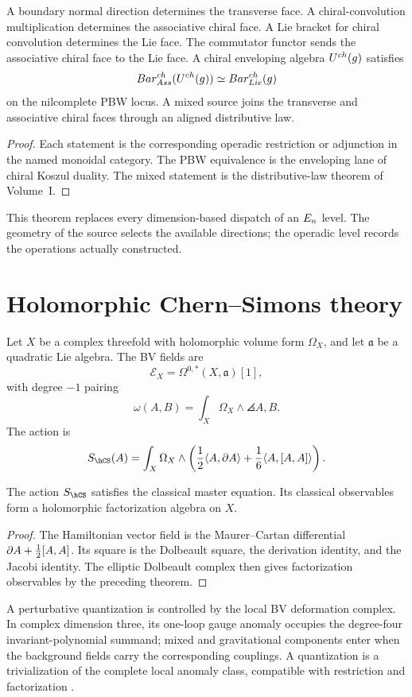 \begin{theorem}
A boundary normal direction determines the transverse face.  A chiral-convolution multiplication determines the associative chiral face.  A Lie bracket for chiral convolution determines the Lie face.  The commutator functor sends the associative chiral face to the Lie face.  A chiral enveloping algebra $U^{ch}(g)$ satisfies
\[
 Bar^{ch}_{Ass}(U^{ch}(g))\simeq Bar^{ch}_{Lie}(g)
\]
on the nilcomplete PBW locus.  A mixed source joins the transverse and associative chiral faces through an aligned distributive law.
\end{theorem}
\begin{proof}
Each statement is the corresponding operadic restriction or adjunction in the named monoidal category.  The PBW equivalence is the enveloping lane of chiral Koszul duality.  The mixed statement is the distributive-law theorem of Volume~I.
\end{proof}

This theorem replaces every dimension-based dispatch of an $E_n$ level.  The geometry of the source selects the available directions; the operadic level records the operations actually constructed.

\chapter{Holomorphic Chern--Simons theory}
Let $X$ be a complex threefold with holomorphic volume form $\Omega_X$, and let $\mathfrak a$ be a quadratic Lie algebra. The BV fields are
\[
 \mathcal E_X=\Omega^{0,*}(X,\mathfrak a)[1],
\]
with degree $-1$ pairing
\[
 \omega(A,B)=\int_X\Omega_X\wedge\angles{A,B}.
\]
The action is
\[
 S_{\hCS}(A)=\int_X\Omega_X\wedge
 \left(\frac12\angles{A,\dbar A}+\frac16\angles{A,[A,A]}\right).
\]

\begin{theorem}
The action $S_{\hCS}$ satisfies the classical master equation. Its classical observables form a holomorphic factorization algebra on $X$.
\end{theorem}
\begin{proof}
The Hamiltonian vector field is the Maurer--Cartan differential $\partial A+\frac12[A,A]$. Its square is the Dolbeault square, the derivation identity, and the Jacobi identity. The elliptic Dolbeault complex then gives factorization observables by the preceding theorem.
\end{proof}

A perturbative quantization is controlled by the local BV deformation complex. In complex dimension three, its one-loop gauge anomaly occupies the degree-four invariant-polynomial summand; mixed and gravitational components enter when the background fields carry the corresponding couplings. A quantization is a trivialization of the complete local anomaly class, compatible with restriction and factorization \cite{CostelloLiAnomaly}.

